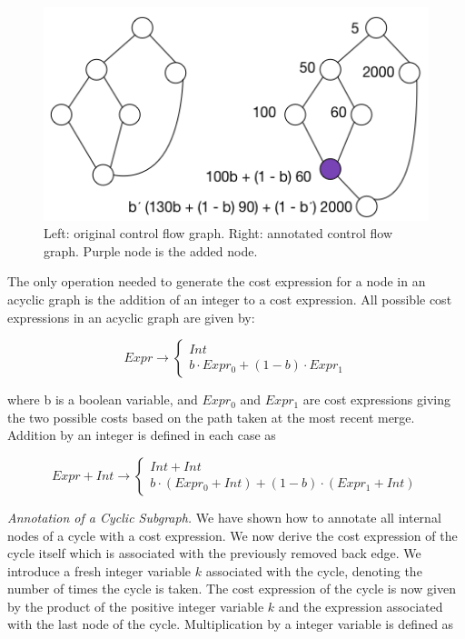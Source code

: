 \begin{figure}
  \includegraphics[scale=.5]{merge_paths.png}
  \caption{Left: original control flow graph. Right: annotated control flow graph. Purple node is the added node.}
  \label{fig:merge}
\end{figure}


The only operation needed to generate the cost expression for a node in an acyclic graph is the addition of an integer to a cost expression. All possible cost expressions in an acyclic graph are given by:

$$Expr \rightarrow \begin{cases} Int  \\ b \cdot Expr_{0} + (1 - b) \cdot Expr_{1} \end{cases}$$

where b is a boolean variable, and $Expr_0$ and $Expr_1$ are cost expressions giving the two possible costs based on the path taken at the most recent merge. Addition by an integer is defined in each case as 

 $$Expr + Int \rightarrow \begin{cases} Int + Int \\ b \cdot (Expr_0 + Int) + (1 - b) \cdot (Expr_1 + Int) \end{cases}$$
  


\textit{Annotation of a Cyclic Subgraph.} We have shown how to annotate all internal nodes of a cycle with a cost expression. We now derive the cost expression of the cycle itself which is associated with the previously removed back edge. We introduce a fresh integer variable $k$ associated with the cycle, denoting the number of times the cycle is taken. The cost expression of the cycle is now given by the product of the positive integer variable $k$ and the expression associated with the last node of the cycle. Multiplication by a integer variable is defined as 

